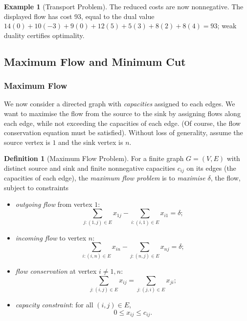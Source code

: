 \documentclass[11pt]{article}
\theoremstyle{definition}
\newtheorem{definition}[theorem]{Definition}
\newtheorem{example}[theorem]{Example}
\theoremstyle{remark}
\newcommand{\pqty}[1]{\left(#1\right)}
\begin{document}
\begin{example}[Transport Problem]
    The reduced costs are now nonnegative. The displayed flow has cost 93, equal to the dual value \(14(0)+10(-3)+9(0)+12(5)+5(3)+8(2)+8(4)=93\); weak duality certifies optimality.
\end{example}

\subsection{Maximum Flow and Minimum Cut}
\subsubsection{Maximum Flow}

We now consider a directed graph with \emph{capacities} assigned to each edges. We want to maximise the flow from the source to the sink by assigning flows along each edge, while not exceeding the capacities of each edge. (Of course, the flow conservation equation must be satisfied). Without loss of generality, assume the source vertex is \(1\) and the sink vertex is \(n\).

\begin{definition}[Maximum Flow Problem]\label{optim-unit-0076}
    For a finite graph \(G=\pqty{V,E}\) with distinct source and sink and finite nonnegative capacities \(c_{ij}\) on its edges (the capacities of each edge), the \emph{maximum flow problem} is to \emph{maximise} \(\delta\), the flow, subject to constraints
    \begin{itemize}
        \item \emph{outgoing flow} from vertex \(1\):
        \[
            \sum_{j: \pqty{1, j} \in E} x_{1j} - \sum_{i: \pqty{i, 1} \in E} x_{i1} = \delta;
        \]
        \item \emph{incoming flow} to vertex \(n\):
        \[
            \sum_{i: \pqty{i, n} \in E} x_{in} - \sum_{j: \pqty{n, j} \in E} x_{nj} = \delta;
        \]
        \item \emph{flow conservation} at vertex \(i \neq 1, n\):
        \[
            \sum_{j: \pqty{i, j} \in E} x_{ij} = \sum_{j: \pqty{j, i} \in E} x_{ji};
        \]
        \item \emph{capacity constraint}: for all \(\pqty{i, j} \in E\),
        \[
            0 \leq x_{ij} \leq c_{ij}.
        \]
    \end{itemize}
\end{definition}
\end{document}
